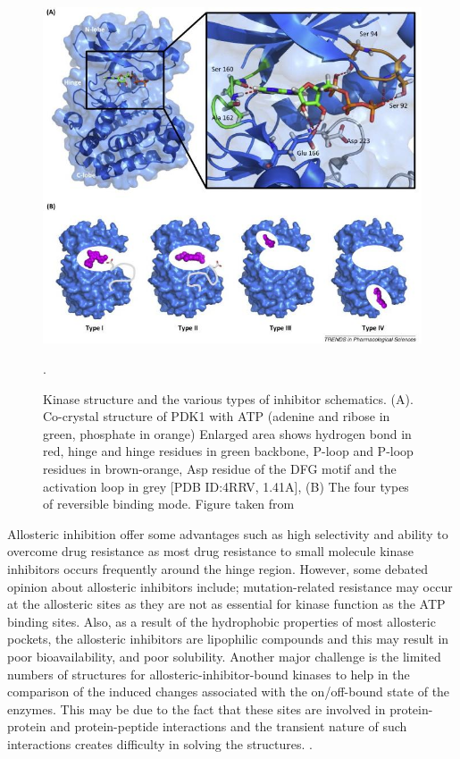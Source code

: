 \documentclass[a4paper, 11pt]{article}
\begin{document}
\begin{figure}[H]
	\includegraphics[width=.8\linewidth]{figures/kinase_inhibitors.jpg}
	\centering
	\caption{Kinase structure and the various types of inhibitor schematics. (A). Co-crystal structure of PDK1 with ATP (adenine and ribose in green, phosphate in orange) Enlarged area shows hydrogen bond in red, hinge and hinge residues in green backbone, P-loop and P-loop residues in brown-orange, Asp residue of the DFG motif  and the activation loop in grey [PDB ID:4RRV, 1.41A], (B) The four types of reversible binding  mode. Figure taken from \cite{wu2015fda}}.
	\label{type4inhibitor}
\end{figure}
Allosteric inhibition offer some advantages such as high  selectivity and ability to overcome drug resistance as most drug resistance to small molecule kinase inhibitors occurs frequently around the hinge region. However, some debated opinion about allosteric inhibitors include; mutation-related resistance may occur at the allosteric sites as they are not as essential for kinase function as the ATP binding sites. Also, as a result of the hydrophobic properties of most allosteric pockets, the allosteric inhibitors are lipophilic compounds and this may result in poor bioavailability, and poor solubility. Another major challenge is the limited numbers of structures for allosteric-inhibitor-bound kinases to help in the comparison of the induced changes associated with the on/off-bound state of the enzymes. This may be due to the fact that these sites are involved in protein-protein and protein-peptide interactions and the transient nature of such interactions creates difficulty in solving the structures. \cite{wu2015allosteric}.
\end{document}
